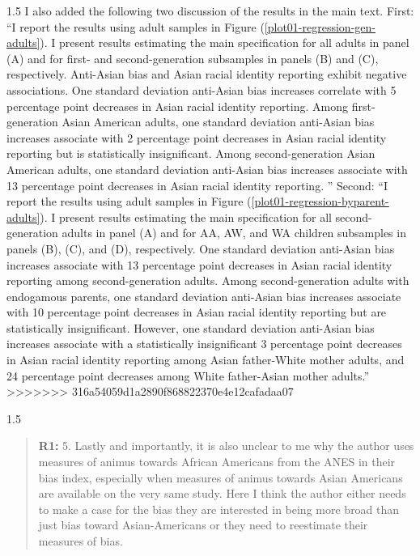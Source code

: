 \documentclass[12pt,english]{article}
\newcommand{\rrxspc}{1.5}
\begin{document}
\begin{refsection}
\begin{spacing}{\rrxspc}
        I also added the following two discussion of the results in the main text. First: ``I report the results using adult samples in Figure (\ref{plot01-regression-gen-adults}). I present results estimating the main specification for all adults in panel (A) and for first- and second-generation subsamples in panels (B) and (C), respectively. Anti-Asian bias and Asian racial identity reporting exhibit negative associations. One standard deviation anti-Asian bias increases correlate with 5 percentage point decreases in Asian racial identity reporting. Among first-generation Asian American adults, one standard deviation anti-Asian bias increases associate with 2 percentage point decreases in Asian racial identity reporting but is statistically insignificant. Among second-generation Asian American adults, one standard deviation anti-Asian bias increases associate with 13 percentage point decreases in Asian racial identity reporting. '' Second: ``I report the results using adult samples in Figure (\ref{plot01-regression-byparent-adults}). I present results estimating the main specification for all second-generation adults in panel (A) and for AA, AW, and WA children subsamples in panels (B), (C), and (D), respectively. One standard deviation anti-Asian bias increases associate with 13 percentage point decreases in Asian racial identity reporting among second-generation adults. Among second-generation adults with endogamous parents, one standard deviation anti-Asian bias increases associate with 10 percentage point decreases in Asian racial identity reporting but are statistically insignificant. However, one standard deviation anti-Asian bias increases associate with a statistically insignificant 3 percentage point decreases in Asian racial identity reporting among Asian father-White mother adults, and 24 percentage point decreases among White father-Asian mother adults.''
>>>>>>> 316a54059d1a2890f868822370e4e12cafadaa07
    \end{spacing}

    \begin{spacing}{\rrxspc}
        \begin{quotation}
            \textbf{R1: } 5. Lastly and importantly, it is also unclear to me why the author uses measures of animus towards African Americans from the ANES in their bias index, especially when measures of animus towards Asian Americans are available on the very same study. Here I think the author either needs to make a case for the bias they are interested in being more broad than just bias toward Asian-Americans or they need to reestimate their measures of bias.
        \end{quotation}
    \end{spacing}


\end{refsection}
\end{document}

